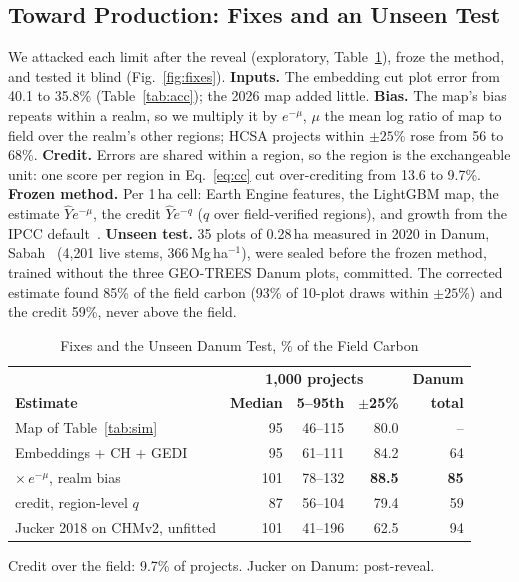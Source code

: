 \documentclass[conference,a4paper]{IEEEtran}
\newcommand{\Mgha}{\,Mg\,ha$^{-1}$}
\begin{document}
\subsection{Toward Production: Fixes and an Unseen Test}
\label{sec:prod}
We attacked each limit after the reveal (exploratory, Table~\ref{tab:prod}), froze the method, and tested it blind (Fig.~\ref{fig:fixes}). \textbf{Inputs.} The embedding cut plot error from 40.1 to 35.8\% (Table~\ref{tab:acc}); the 2026 map added little. \textbf{Bias.} The map's bias repeats within a realm, so we multiply it by $e^{-\mu}$, $\mu$ the mean log ratio of map to field over the realm's other regions; HCSA projects within $\pm25$\% rose from 56 to 68\%. \textbf{Credit.} Errors are shared within a region, so the region is the exchangeable unit: one score per region in Eq.~\ref{eq:cc} cut over-crediting from 13.6 to 9.7\%. \textbf{Frozen method.} Per 1\,ha cell: Earth Engine features, the LightGBM map, the estimate $\hat Y e^{-\mu}$, the credit $\hat Y e^{-q}$ ($q$ over field-verified regions), and growth from the IPCC default~\cite{ipcc2019v4}. \textbf{Unseen test.} 35 plots of 0.28\,ha measured in 2020 in Danum, Sabah~\cite{keller2023danum} (4{,}201 live stems, 366\Mgha), were sealed before the frozen method, trained without the three GEO-TREES Danum plots, committed. The corrected estimate found 85\% of the field carbon (93\% of 10-plot draws within $\pm25$\%) and the credit 59\%, never above the field.

\begin{table}[t]
\centering
\caption{Fixes and the Unseen Danum Test, \% of the Field Carbon}
\label{tab:prod}
\footnotesize
\setlength{\tabcolsep}{3pt}
\begin{tabular}{@{}l r r r r@{}}
\toprule
 & \multicolumn{3}{c}{\textbf{1{,}000 projects}} & \textbf{Danum}\\
\textbf{Estimate} & \textbf{Median} & \textbf{5--95th} & \textbf{$\pm$25\%} & \textbf{total}\\
\midrule
Map of Table~\ref{tab:sim} & 95 & 46--115 & 80.0 & --\\
Embeddings + CH + GEDI & 95 & 61--111 & 84.2 & 64\\
\quad $\times\,e^{-\mu}$, realm bias & 101 & 78--132 & \textbf{88.5} & \textbf{85}\\
\quad credit, region-level $q$ & 87 & 56--104 & 79.4 & 59\\
Jucker 2018 on CHMv2, unfitted & 101 & 41--196 & 62.5 & 94\\
\bottomrule
\end{tabular}

\vspace{2pt}
{\scriptsize Credit over the field: 9.7\% of projects. Jucker on Danum: post-reveal.\par}
\end{table}
\end{document}
